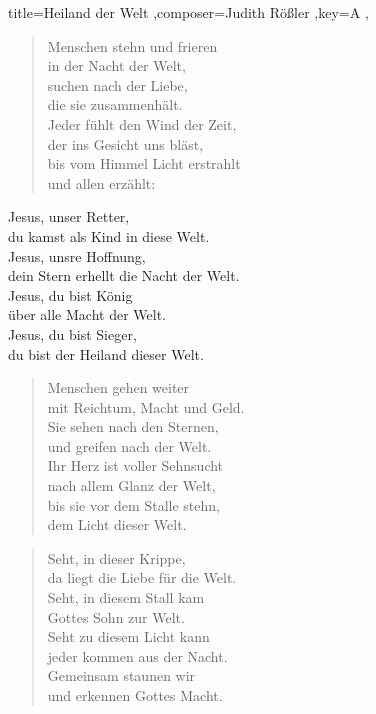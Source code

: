 \documentclass[]{leadsheet}
\begin{document}
\begin{song}{title={Heiland der Welt
},composer={Judith Rößler
},key={A
},}
\begin{verse}
Menschen stehn und frieren \\
in der Nacht der Welt, \\
suchen nach der Liebe, \\
die sie zusammenhält. \\
Jeder fühlt den Wind der Zeit, \\
der ins Gesicht uns bläst, \\
bis vom Himmel Licht erstrahlt \\
und allen erzählt: \\
\end{verse}

\begin{chorus}
Jesus, unser Retter, \\
du kamst als Kind in diese Welt. \\
Jesus, unsre Hoffnung, \\
dein Stern erhellt die Nacht der Welt. \\
Jesus, du bist König \\
über alle Macht der Welt. \\
Jesus, du bist Sieger, \\
du bist der Heiland dieser Welt. \\
\end{chorus}

\begin{verse}
Menschen gehen weiter \\
mit Reichtum, Macht und Geld. \\
Sie sehen nach den Sternen, \\
und greifen nach der Welt. \\
Ihr Herz ist voller Sehnsucht \\
nach allem Glanz der Welt, \\
bis sie vor dem Stalle stehn, \\
dem Licht dieser Welt. \\
\end{verse}

\begin{verse}
Seht, in dieser Krippe, \\
da liegt die Liebe für die Welt. \\
Seht, in diesem Stall kam \\
Gottes Sohn zur Welt. \\
Seht zu diesem Licht kann \\
jeder kommen aus der Nacht. \\
Gemeinsam staunen wir \\
und erkennen Gottes Macht. \\
\end{verse}

\end{song}
\end{document}
